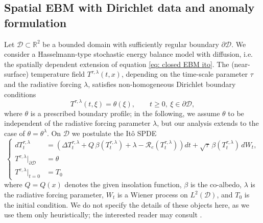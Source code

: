 \documentclass[10pt]{amsart}
\numberwithin{equation}{section}
\begin{document}
\subsection{Spatial EBM with Dirichlet data and anomaly formulation}
\label{subsec: spde dirichlet} 
Let $\mathcal D\subset\mathbb{R}^2$ be a bounded domain with sufficiently regular boundary $\partial  \mathcal D$.
We consider a Hasselmann-type stochastic energy balance model with diffusion, i.e. the spatially dependent extension of equation \eqref{eq: closed EBM ito}. The (near-surface)
temperature field $T^{\tau,\lambda}(t,x)$, depending on the time-scale parameter $\tau$ and the radiative forcing $\lambda$, satisfies non-homogeneous Dirichlet boundary conditions
\begin{equation}
T^{\tau,\lambda}(t,\xi)=\theta(\xi), \qquad t \geq 0, \ \xi\in\partial  \mathcal D,
\label{eq: dirichlet T}
\end{equation}
where $\theta$ is a prescribed boundary profile; in the following, we assume $\theta $ to be independent of the radiative forcing parameter $\lambda$, but our analysis extends to the case of $\theta = \theta^\lambda$.
On $\mathcal D$ we postulate the It\^o SPDE
\begin{equation}
\left \lbrace 
\begin{aligned}
dT_t ^{\tau,\lambda} &= \left(\Delta T_t ^{\tau,\lambda}+ Q\,\beta(T_t^{\tau,\lambda})+\lambda-\mathcal R_e(T_t ^{\tau,\lambda})\right)dt
+ \sqrt{\tau}\,\beta(T_t ^{\tau,\lambda})\,dW_t, \\
T^{\tau,\lambda}|_{\partial \mathcal{D}} &= \theta\\
T^{\tau,\lambda}|_{t = 0} & = T_0 
\end{aligned}
\label{eq: SPDE T}
\right.
\end{equation}
where $ Q= Q(x)$ denotes the given insolation function, $\beta$ is the
co-albedo, $\lambda$ is the radiative forcing parameter, $W_t$ is a Wiener process on $L^2(\mathcal{D})$, and $T_0$ is the initial condition. We do not specify the details of these objects here, as we use them only heuristically; the interested reader may consult \cite{DPZ}.
\end{document}
